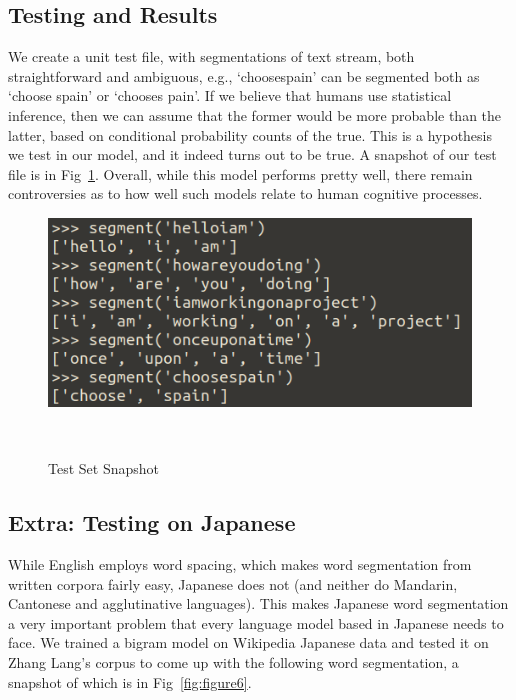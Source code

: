 \documentclass{article}
\begin{document}
\subsection{Testing and Results}
\vspace{-1mm}
We create a unit test file, with segmentations of text stream, both straightforward and ambiguous, e.g., `choosespain' can be segmented both as `choose spain' or `chooses pain'. If we believe that humans use statistical inference, then we can assume that the former would be more probable than the latter, based on conditional probability counts of the true. This is a hypothesis we test in our model, and it indeed turns out to be true. A snapshot of our test file is in Fig~\ref{fig:figure5}. Overall, while this model performs pretty well, there remain controversies as to how well such models relate to human cognitive processes.
\vspace{-1mm}
\begin{figure}[h!]
  \centering
  \includegraphics[scale=0.8]{figures/ngram_test_set.png}
  \caption{Test Set Snapshot}~\label{fig:figure5}
\end{figure}

\subsection{Extra: Testing on Japanese}
\vspace{-1mm}
While English employs word spacing, which makes word segmentation from written corpora fairly easy, Japanese does not (and neither do Mandarin, Cantonese and agglutinative languages). This makes Japanese word segmentation a very important problem that every language model based in Japanese needs to face. We trained a bigram model on Wikipedia Japanese data and tested it on Zhang Lang's corpus to come up with the following word segmentation, a snapshot of which is in Fig~\ref{fig:figure6}.
\end{document}
